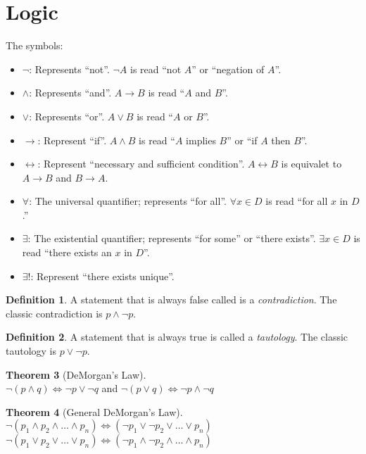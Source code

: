 \documentclass[11pt]{article}
\theoremstyle{definition}
\newtheorem{theorem}{Theorem}[section]
\newtheorem{definition}[theorem]{Definition}
\begin{document}
\section{Logic}
The symbols:
\begin{itemize}
    \item $\lnot$: Represents ``not''. $\lnot A$ is read ``not $A$'' or ``negation of $A$''.
    \item $\land$: Represents ``and''. $A \rightarrow B$ is read ``$A$ and $B$''.
    \item $\lor$: Represents ``or''. $A \lor B$ is read ``$A$ or $B$''.
    \item $\rightarrow$: Represent ``if''. $A \land B$ is read ``$A$ implies $B$'' or ``if $A$ then $B$''.
    \item $\leftrightarrow$: Represent ``necessary and sufficient condition''. $A \leftrightarrow B$ is equivalet to $A \rightarrow B$ and $B \rightarrow A$.
    \item $\forall$: The universal quantifier; represents ``for all''. $\forall x \in D$ is read ``for all $x$ in $D$.''
    \item $\exists$: The existential quantifier; represents ``for some'' or ``there exists''. $\exists x \in D$ is read ``there exists an $x$ in $D$''.
    \item $\exists!$: Represent ``there exists unique''. 
\end{itemize}
\begin{definition}
    A statement that is always false called is a \emph{contradiction}. The classic contradiction is $p \land \lnot p$.
\end{definition}
\begin{definition}
    A statement that is always true is called a \emph{tautology}. The classic tautology is $p \lor \lnot p$.
\end{definition}
\begin{theorem}[DeMorgan's Law]~\\
    $\lnot (p \land q) \iff \lnot p \lor \lnot q$ and
    $\lnot (p \lor q) \iff \lnot p \land \lnot q$
\end{theorem}
\begin{theorem}[General DeMorgan's Law]~\\
    $\lnot(p_1 \land p_2 \land \dots \land p_n) \iff (\lnot p_1 \lor \lnot p_2 \lor \dots \lor p_n)$ \\
    $\lnot(p_1 \lor p_2 \lor  \dots \lor  p_n) \iff (\lnot p_1 \land \lnot p_2 \land \dots \land p_n)$ \\
\end{theorem}
\end{document}
